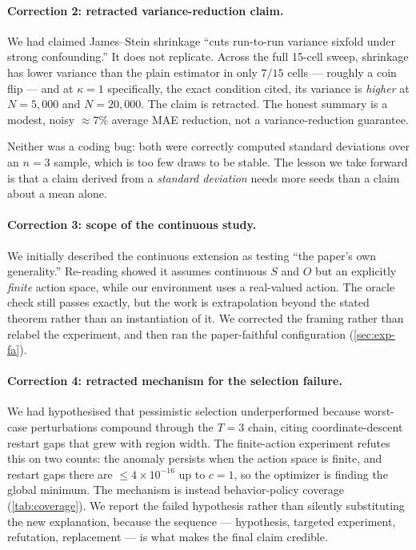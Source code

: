 \paragraph{Correction 2: retracted variance-reduction claim.} We had claimed
James--Stein shrinkage ``cuts run-to-run variance sixfold under strong
confounding.'' It does not replicate. Across the full 15-cell sweep, shrinkage
has lower variance than the plain estimator in only $7/15$ cells --- roughly a
coin flip --- and at $\kappa = 1$ specifically, the exact condition cited, its
variance is \emph{higher} at $N{=}5{,}000$ and $N{=}20{,}000$. The claim is
retracted. The honest summary is a modest, noisy $\approx\!7\%$ average MAE
reduction, not a variance-reduction guarantee.

Neither was a coding bug: both were correctly computed standard deviations over
an $n{=}3$ sample, which is too few draws to be stable. The lesson we take
forward is that a claim derived from a \emph{standard deviation} needs more seeds
than a claim about a mean alone.

\paragraph{Correction 3: scope of the continuous study.} We initially described
the continuous extension as testing ``the paper's own generality.'' Re-reading
\citet{hong2024} showed it assumes continuous $S$ and $O$ but an explicitly
\emph{finite} action space, while our environment uses a real-valued action. The
oracle check still passes exactly, but the work is extrapolation beyond the
stated theorem rather than an instantiation of it. We corrected the framing
rather than relabel the experiment, and then ran the paper-faithful configuration
(\cref{sec:exp-fa}).

\paragraph{Correction 4: retracted mechanism for the selection failure.} We had
hypothesised that pessimistic selection underperformed because worst-case
perturbations compound through the $T{=}3$ chain, citing coordinate-descent
restart gaps that grew with region width. The finite-action experiment refutes
this on two counts: the anomaly persists when the action space is finite, and
restart gaps there are $\le 4\times10^{-16}$ up to $c{=}1$, so the optimizer is
finding the global minimum. The mechanism is instead behavior-policy coverage
(\cref{tab:coverage}). We report the failed hypothesis rather than silently
substituting the new explanation, because the sequence --- hypothesis, targeted
experiment, refutation, replacement --- is what makes the final claim credible.


